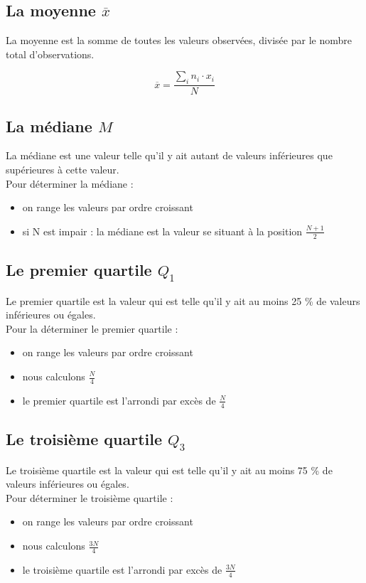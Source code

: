 \documentclass[utf8, a4paper, 12 pt]{article}
\begin{document}
    \subsection{La moyenne \(\overline{x}\)}
    La moyenne est la somme de toutes les valeurs observées, divisée par le nombre total 
    d'observations.

    \[\overline{x} =\frac{ \sum_{i} {n_i\cdot x_i} }{N}\]

    \subsection{La médiane $M$}
    La médiane est une valeur telle qu'il y ait autant de valeurs inférieures 
    que supérieures à cette valeur.\\
    Pour déterminer la médiane :\begin{itemize}
        \item on range les valeurs par ordre croissant
        \item si N est impair : la médiane est la valeur se situant à la position \(\frac{N+1}{2}\)
    \end{itemize} \vspace{1\baselineskip}
    \subsection{Le premier quartile $Q_1$}
    Le premier quartile est la valeur qui est telle qu'il y ait au moins 25 \% de valeurs inférieures ou égales.\\
    Pour la déterminer le premier quartile :\begin{itemize}
        \item on range les valeurs par ordre croissant
        \item nous calculons  $\frac{N}{4}$\
        \item le premier quartile est l'arrondi par excès de  $\frac{N}{4}$\     
    \end{itemize} \vspace{1\baselineskip}

    \subsection{Le troisième quartile $Q_3$}
    Le troisième quartile est la valeur qui est telle qu'il y ait au moins 75 \% de valeurs inférieures ou égales.\\
    Pour déterminer le troisième quartile :\begin{itemize}
        \item on range les valeurs par ordre croissant
        \item nous calculons  $\frac{3N}{4}$\
        \item le troisième quartile est l'arrondi par excès de  $\frac{3N}{4}$\     
    \end{itemize} \vspace{1\baselineskip}
\end{document}
